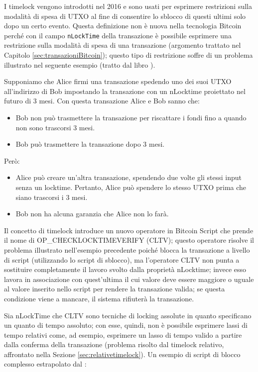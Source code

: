 I timelock vengono introdotti nel 2016 e sono usati per esprimere restrizioni sulla modalità di spesa di UTXO al fine di consentire lo sblocco di questi ultimi solo dopo un certo evento. Questa definizione non è nuova nella tecnologia Bitcoin perché con il campo {\tt{nLockTime}} della transazione è possibile esprimere una restrizione sulla modalità di spesa di una transazione (argomento trattato nel Capitolo \ref{sec:transazioniBitcoin}); questo tipo di restrizione soffre di un problema illustrato nel seguente esempio (tratto dal libro \cite{bitcoinbook}).

\begin{example}

Supponiamo che Alice firmi una transazione spedendo uno dei suoi UTXO all'indirizzo di Bob impostando la transazione con un nLocktime proiettato nel futuro di 3 mesi.
Con questa transazione Alice e Bob sanno che:
\begin{itemize}
  \item Bob non può trasmettere la transazione per riscattare i fondi fino a quando non sono trascorsi 3 mesi.
  \item Bob può trasmettere la transazione dopo 3 mesi.
\end{itemize}
Però:
\begin{itemize}
  \item Alice può creare un'altra transazione, spendendo due volte gli stessi input senza un locktime. Pertanto, Alice può spendere lo stesso UTXO prima che siano trascorsi i 3 mesi.
  \item Bob non ha alcuna garanzia che Alice non lo farà.
\end{itemize}
\end{example}

Il concetto di timelock introduce un nuovo operatore in Bitcoin Script che prende il nome di OP\_CHECKLOCKTIMEVERIFY (CLTV); questo operatore risolve il problema illustrato nell’esempio precedente poiché blocca la  transazione a livello di script (utilizzando lo script di sblocco), ma l’operatore CLTV non punta a sostituire completamente il lavoro svolto dalla proprietà nLocktime; invece esso lavora in associazione con quest’ultima il cui valore deve essere maggiore o uguale al valore inserito nello script per rendere la transazione valida; se questa condizione viene a mancare, il sistema rifiuterà la transazione.

Sia nLockTime che CLTV sono tecniche di locking assolute in quanto specificano un quanto di tempo assoluto; con esse, quindi, non è possibile esprimere lassi di tempo relativi come, ad esempio, esprimere un lasso di tempo valido a partire dalla conferma della transazione (problema risolto dal timelock relativo, affrontato nella Sezione \ref{sec:relativetimelock}).
Un esempio di script di blocco complesso estrapolato dal \cite{bitcoinbip:bip68}:

